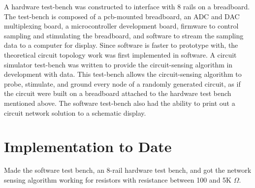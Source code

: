 A hardware test-bench was constructed to interface with 8 rails on a breadboard.
The test-bench is composed of a pcb-mounted breadboard, an ADC and DAC multiplexing board, a microcontroller development board, firmware to control sampling and stimulating the breadboard, and software to stream the sampling data to a computer for display.
Since software is faster to prototype with, the theoretical circuit topology work was first implemented in software.
A circuit simulator test-bench was written to provide the circuit-sensing algorithm in development with data.
This test-bench allows the circuit-sensing algorithm to probe, stimulate, and ground every node of a randomly generated circuit, as if the circuit were built on a breadboard attached to the hardware test bench mentioned above.
The software test-bench also had the ability to print out a circuit network solution to a schematic display.


\section{Implementation to Date}

Made the software test bench, an 8-rail hardware test bench, and got the network sensing algorithm working for resistors with resistance between 100 and 5K $\Omega$.




